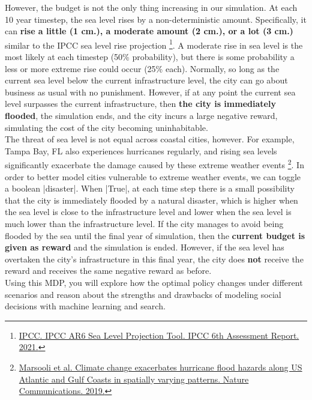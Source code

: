 However, the budget is not the only thing increasing in our simulation. At each 10 year timestep, the sea level rises by a non-deterministic amount. Specifically, it can \textbf{rise a little (1 cm.), a moderate amount (2 cm.), or a lot (3 cm.)} similar to the IPCC sea level rise projection \footnote{\href{https://sealevel.nasa.gov/data_tools/17}{IPCC. IPCC AR6 Sea Level Projection Tool. IPCC 6th Assessment Report. 2021.}}. A moderate rise in sea level is the most likely at each timestep (50\% probability), but there is some probability a less or more extreme rise could occur (25\% each). Normally, so long as the current sea level below the current infrastructure level, the city can go about business as usual with no punishment. However, if at any point the current sea level surpasses the current infrastructure, then \textbf{the city is immediately flooded}, the simulation ends, and the city incurs a large negative reward, simulating the cost of the city becoming uninhabitable. \\

The threat of sea level is not equal across coastal cities, however. For example, Tampa Bay, FL also experiences hurricanes regularly, and rising sea levels significantly exacerbate the damage caused by these extreme weather events \footnote{\href{https://www.nature.com/articles/s41467-019-11755-z}{Marsooli et al. Climate change exacerbates hurricane flood hazards along US Atlantic and Gulf Coasts in spatially varying patterns. Nature Communications. 2019.}}. In order to better model cities vulnerable to extreme weather events, we can toggle a boolean |disaster|. When |True|, at each time step there is a small possibility that the city is immediately flooded by a natural disaster, which is higher when the sea level is close to the infrastructure level and lower when the sea level is much lower than the infrastructure level. If the city manages to avoid being flooded by the sea until the final year of simulation, then the \textbf{current budget is given as reward} and the simulation is ended. However, if the sea level has overtaken the city's infrastructure in this final year, the city does \textbf{not} receive the reward and receives the same negative reward as before. \\

Using this MDP, you will explore how the optimal policy changes under different scenarios and reason about the strengths and drawbacks of modeling social decisions with machine learning and search. \\

\begin{enumerate}

  

  

  

  

\end{enumerate}
